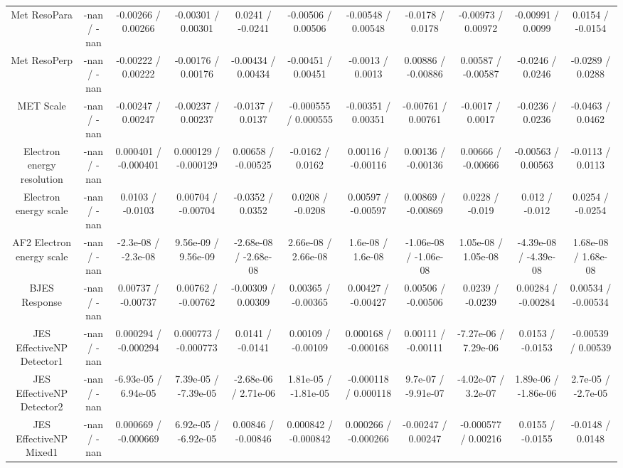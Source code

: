 \begin{table}[htbp]
\begin{center}
\begin{tabular}{|c|c|c|c|c|c|c|c|c|c|c|}
  Met ResoPara & -nan / -nan & -0.00266 / 0.00266 & -0.00301 / 0.00301 & 0.0241 / -0.0241 & -0.00506 / 0.00506 & -0.00548 / 0.00548 & -0.0178 / 0.0178 & -0.00973 / 0.00972 & -0.00991 / 0.0099 & 0.0154 / -0.0154 \\ 
  Met ResoPerp & -nan / -nan & -0.00222 / 0.00222 & -0.00176 / 0.00176 & -0.00434 / 0.00434 & -0.00451 / 0.00451 & -0.0013 / 0.0013 & 0.00886 / -0.00886 & 0.00587 / -0.00587 & -0.0246 / 0.0246 & -0.0289 / 0.0288 \\ 
  MET Scale & -nan / -nan & -0.00247 / 0.00247 & -0.00237 / 0.00237 & -0.0137 / 0.0137 & -0.000555 / 0.000555 & -0.00351 / 0.00351 & -0.00761 / 0.00761 & -0.0017 / 0.0017 & -0.0236 / 0.0236 & -0.0463 / 0.0462 \\ 
  Electron energy resolution & -nan / -nan & 0.000401 / -0.000401 & 0.000129 / -0.000129 & 0.00658 / -0.00525 & -0.0162 / 0.0162 & 0.00116 / -0.00116 & 0.00136 / -0.00136 & 0.00666 / -0.00666 & -0.00563 / 0.00563 & -0.0113 / 0.0113 \\ 
  Electron energy scale & -nan / -nan & 0.0103 / -0.0103 & 0.00704 / -0.00704 & -0.0352 / 0.0352 & 0.0208 / -0.0208 & 0.00597 / -0.00597 & 0.00869 / -0.00869 & 0.0228 / -0.019 & 0.012 / -0.012 & 0.0254 / -0.0254 \\ 
  AF2 Electron energy scale & -nan / -nan & -2.3e-08 / -2.3e-08 & 9.56e-09 / 9.56e-09 & -2.68e-08 / -2.68e-08 & 2.66e-08 / 2.66e-08 & 1.6e-08 / 1.6e-08 & -1.06e-08 / -1.06e-08 & 1.05e-08 / 1.05e-08 & -4.39e-08 / -4.39e-08 & 1.68e-08 / 1.68e-08 \\ 
  BJES Response & -nan / -nan & 0.00737 / -0.00737 & 0.00762 / -0.00762 & -0.00309 / 0.00309 & 0.00365 / -0.00365 & 0.00427 / -0.00427 & 0.00506 / -0.00506 & 0.0239 / -0.0239 & 0.00284 / -0.00284 & 0.00534 / -0.00534 \\ 
  JES EffectiveNP Detector1 & -nan / -nan & 0.000294 / -0.000294 & 0.000773 / -0.000773 & 0.0141 / -0.0141 & 0.00109 / -0.00109 & 0.000168 / -0.000168 & 0.00111 / -0.00111 & -7.27e-06 / 7.29e-06 & 0.0153 / -0.0153 & -0.00539 / 0.00539 \\ 
  JES EffectiveNP Detector2 & -nan / -nan & -6.93e-05 / 6.94e-05 & 7.39e-05 / -7.39e-05 & -2.68e-06 / 2.71e-06 & 1.81e-05 / -1.81e-05 & -0.000118 / 0.000118 & 9.7e-07 / -9.91e-07 & -4.02e-07 / 3.2e-07 & 1.89e-06 / -1.86e-06 & 2.7e-05 / -2.7e-05 \\ 
  JES EffectiveNP Mixed1 & -nan / -nan & 0.000669 / -0.000669 & 6.92e-05 / -6.92e-05 & 0.00846 / -0.00846 & 0.000842 / -0.000842 & 0.000266 / -0.000266 & -0.00247 / 0.00247 & -0.000577 / 0.00216 & 0.0155 / -0.0155 & -0.0148 / 0.0148 \\ 

\end{tabular}
\end{center}
\end{table}
